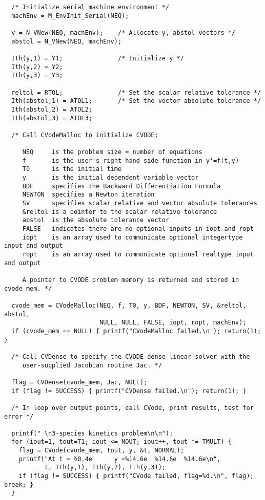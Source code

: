 \begin{verbatim}
  /* Initialize serial machine environment */
  machEnv = M_EnvInit_Serial(NEQ);

  y = N_VNew(NEQ, machEnv);    /* Allocate y, abstol vectors */
  abstol = N_VNew(NEQ, machEnv); 

  Ith(y,1) = Y1;               /* Initialize y */
  Ith(y,2) = Y2;
  Ith(y,3) = Y3;

  reltol = RTOL;               /* Set the scalar relative tolerance */
  Ith(abstol,1) = ATOL1;       /* Set the vector absolute tolerance */
  Ith(abstol,2) = ATOL2;
  Ith(abstol,3) = ATOL3;

  /* Call CVodeMalloc to initialize CVODE: 

     NEQ     is the problem size = number of equations
     f       is the user's right hand side function in y'=f(t,y)
     T0      is the initial time
     y       is the initial dependent variable vector
     BDF     specifies the Backward Differentiation Formula
     NEWTON  specifies a Newton iteration
     SV      specifies scalar relative and vector absolute tolerances
     &reltol is a pointer to the scalar relative tolerance
     abstol  is the absolute tolerance vector
     FALSE   indicates there are no optional inputs in iopt and ropt
     iopt    is an array used to communicate optional integertype input and output
     ropt    is an array used to communicate optional realtype input and output

     A pointer to CVODE problem memory is returned and stored in cvode_mem. */

  cvode_mem = CVodeMalloc(NEQ, f, T0, y, BDF, NEWTON, SV, &reltol, abstol,
                          NULL, NULL, FALSE, iopt, ropt, machEnv);
  if (cvode_mem == NULL) { printf("CVodeMalloc failed.\n"); return(1); }

  /* Call CVDense to specify the CVODE dense linear solver with the
     user-supplied Jacobian routine Jac. */

  flag = CVDense(cvode_mem, Jac, NULL);
  if (flag != SUCCESS) { printf("CVDense failed.\n"); return(1); }

  /* In loop over output points, call CVode, print results, test for error */

  printf(" \n3-species kinetics problem\n\n");
  for (iout=1, tout=T1; iout <= NOUT; iout++, tout *= TMULT) {
    flag = CVode(cvode_mem, tout, y, &t, NORMAL);
    printf("At t = %0.4e      y =%14.6e  %14.6e  %14.6e\n",
           t, Ith(y,1), Ith(y,2), Ith(y,3));
    if (flag != SUCCESS) { printf("CVode failed, flag=%d.\n", flag); break; }
  }


\end{verbatim}
